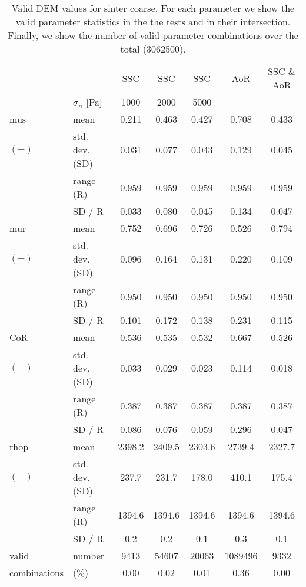 \begin{table}[htbp] 
 \centering 
\begin{tabular}{ll|ccccc} 
 \hline 
 &    & SSC & SSC & SSC & AoR   & SSC \& AoR \\ 
 & $\sigma_n$  [Pa]  & 1000 & 2000 & 5000 &   &  \\ 
 \hline 
\acs{mus} & mean & 0.211 & 0.463 & 0.427 & 0.708 & 0.433 \\ 
$(-)$ & std. dev. (SD) & 0.031 & 0.077 & 0.043 & 0.129 & 0.045 \\ 
 & range (\acs{R}) & 0.959 & 0.959 & 0.959 & 0.959 & 0.959 \\ 
 & SD / R & 0.033 & 0.080 & 0.045 & 0.134 & 0.047 \\ 
 \hline 
\acs{mur} & mean & 0.752 & 0.696 & 0.726 & 0.526 & 0.794 \\ 
$(-)$ & std. dev. (SD) & 0.096 & 0.164 & 0.131 & 0.220 & 0.109 \\ 
 & range (\acs{R}) & 0.950 & 0.950 & 0.950 & 0.950 & 0.950 \\ 
 & SD / R & 0.101 & 0.172 & 0.138 & 0.231 & 0.115 \\ 
 \hline 
\acs{CoR} & mean & 0.536 & 0.535 & 0.532 & 0.667 & 0.526 \\ 
$(-)$ & std. dev. (SD) & 0.033 & 0.029 & 0.023 & 0.114 & 0.018 \\ 
 & range (\acs{R}) & 0.387 & 0.387 & 0.387 & 0.387 & 0.387 \\ 
 & SD / R & 0.086 & 0.076 & 0.059 & 0.296 & 0.047 \\ 
 \hline 
\acs{rhop} & mean & 2398.2 & 2409.5 & 2303.6 & 2739.4 & 2327.7 \\ 
$(-)$ & std. dev. (SD) & 237.7 & 231.7 & 178.0 & 410.1 & 175.4 \\ 
 & range (\acs{R}) & 1394.6 & 1394.6 & 1394.6 & 1394.6 & 1394.6 \\ 
 & SD / R &  0.2 &  0.2 &  0.1 &  0.3 &  0.1 \\ 
 \hline 
valid & number & 9413 & 54607 & 20063 & 1089496 & 9332 \\ 
combinations & (\%)  & 0.00 & 0.02 & 0.01 & 0.36 & 0.00 \\ 
 \hline 
\end{tabular} 
\caption[Valid DEM values for sinter coarse]{Valid DEM values for sinter coarse. 
For each parameter we show the valid parameter statistics in the the tests and in their 
intersection. Finally, we show the number of valid parameter combinations over the total (3062500).} 
\label{tab:31DEMvalidvaluessintercoarse} 
\end{table}